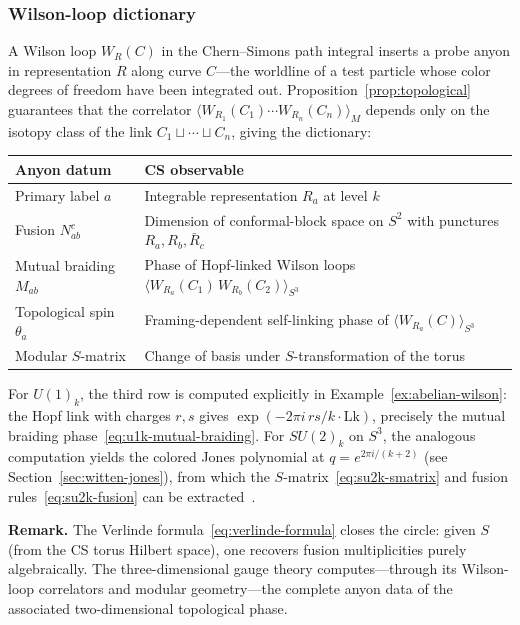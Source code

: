 \subsubsection*{Wilson-loop dictionary}

A Wilson loop $W_R(C)$ in the Chern--Simons path integral inserts a probe anyon
in representation $R$ along curve $C$---the worldline of a test particle whose
color degrees of freedom have been integrated out.
Proposition~\ref{prop:topological} guarantees that the correlator
$\langle W_{R_1}(C_1) \cdots W_{R_n}(C_n)\rangle_M$ depends only on the
isotopy class of the link $C_1 \sqcup \cdots \sqcup C_n$, giving the
dictionary:

\begin{center}
\renewcommand{\arraystretch}{1.3}
\begin{tabular}{@{}ll@{}}
\hline
\textbf{Anyon datum} & \textbf{CS observable} \\
\hline
Primary label $a$ & Integrable representation $R_a$ at level $k$ \\
Fusion $N^c_{ab}$ & Dimension of conformal-block space on $S^2$
    with punctures $R_a, R_b, \bar R_c$ \\
Mutual braiding $M_{ab}$ & Phase of Hopf-linked Wilson loops
    $\langle W_{R_a}(C_1)\, W_{R_b}(C_2)\rangle_{S^3}$ \\
Topological spin $\theta_a$ & Framing-dependent self-linking phase of
    $\langle W_{R_a}(C)\rangle_{S^3}$ \\
Modular $S$-matrix & Change of basis under $S$-transformation of the torus \\
\hline
\end{tabular}
\end{center}

\noindent
For $U(1)_k$, the third row is computed explicitly in
Example~\ref{ex:abelian-wilson}: the Hopf link with charges $r,s$ gives
$\exp(-2\pi i\, rs/k \cdot \mathrm{Lk})$, precisely the mutual braiding
phase~\eqref{eq:u1k-mutual-braiding}.  For $SU(2)_k$ on $S^3$, the
analogous computation yields the colored Jones polynomial at
$q = e^{2\pi i/(k+2)}$ (see Section~\ref{sec:witten-jones}), from which
the $S$-matrix~\eqref{eq:su2k-smatrix} and fusion rules~\eqref{eq:su2k-fusion}
can be extracted~\cite{Witten1989Jones}.

\medskip
\noindent\textbf{Remark.}
The Verlinde formula~\eqref{eq:verlinde-formula} closes the circle: given $S$
(from the CS torus Hilbert space), one recovers fusion multiplicities purely
algebraically.  The three-dimensional gauge theory computes---through its
Wilson-loop correlators and modular geometry---the complete anyon data of the
associated two-dimensional topological phase.

